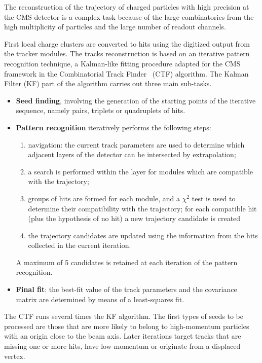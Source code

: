 The reconstruction of the trajectory of charged particles with high precision at the CMS detector
is a complex task because of the large combinatorics from the high multiplicity of particles and the large number of readout channels.

First local charge clusters are converted to hits using the digitized output from the tracker modules.
The tracks reconstruction is based on an iterative pattern recognition technique,
a Kalman-like fitting procedure adapted for the CMS framework in the Combinatorial Track Finder~\cite{billoir.qian:simultaneous, Speer:2005dp} (CTF) algorithm.
The Kalman Filter (KF) part of the algorithm carries out three main sub-tasks.
\begin{itemize}
\item \textbf{Seed finding}, involving the generation of the starting points of the iterative sequence, namely pairs, triplets or quadruplets of hits.
\item \textbf{Pattern recognition} iteratively performs the following steps:
  \begin{enumerate}
  \item navigation: the current track parameters are used to determine which adjacent layers of the detector can be intersected by extrapolation;
  \item a search is performed within the layer for modules which are compatible with the trajectory;
  \item groups of hits are formed for each module, and a $\chi^2$ test is used to determine their compatibility with the trajectory;
    for each compatible hit (plus the hypothesis of no hit) a new trajectory candidate is created
  \item the trajectory candidates are updated using the information from the hits collected in the current iteration.
  \end{enumerate}
  A maximum of 5 candidates is retained at each iteration of the pattern recognition.
\item \textbf{Final fit}: the best-fit value of the track parameters and the covariance matrix are determined by means of a least-squares fit.
\end{itemize}
The CTF runs several times the KF algorithm.
The first types of seeds to be processed are those that are more likely to belong to high-momentum particles with an origin close to the beam axis.
Later iterations target tracks that are missing one or more hits, have low-momentum or originate from a displaced vertex.

